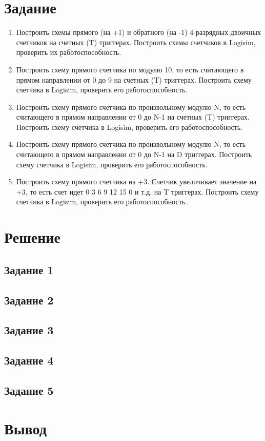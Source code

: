 \documentclass[a4paper,14pt]{extarticle}
\begin{document}
	\section*{Задание}
	\begin{enumerate}
		\item Построить схемы прямого (на +1) и обратного (на -1) 4-разрядных двоичных счетчиков на счетных (T) триггерах. Построить схемы счетчиков в Logisim, проверить их работоспособность.
		
		\item Построить схему прямого счетчика по модулю 10, то есть считающего в прямом направлении от 0 до 9 на счетных (T) триггерах. Построить схему счетчика в Logisim, проверить его работоспособность.
		
		\item Построить схему прямого счетчика по произвольному модулю N, то есть считающего в прямом направлении от 0 до N-1 на счетных (T) триггерах. Построить схему счетчика в Logisim, проверить его работоспособность.
		
		\item Построить схему прямого счетчика по произвольному модулю N, то есть считающего в прямом направлении от 0 до N-1 на D триггерах. Построить схему счетчика в Logisim, проверить его работоспособность.
		
		\item Построить схему прямого счетчика на +3. Счетчик увеличивает значение на +3, то есть счет идет 0 3 6 9 12 15 0 и т.д. на T триггерах. Построить схему счетчика в Logisim, проверить его работоспособность.
	\end{enumerate}
	
	\newpage
	\section*{Решение}
	\subsection*{Задание 1}

	\subsection*{Задание 2}
	
	\subsection*{Задание 3}
	
	\subsection*{Задание 4}
	
	\subsection*{Задание 5}
	
	\section*{Вывод}
	
\end{document}
